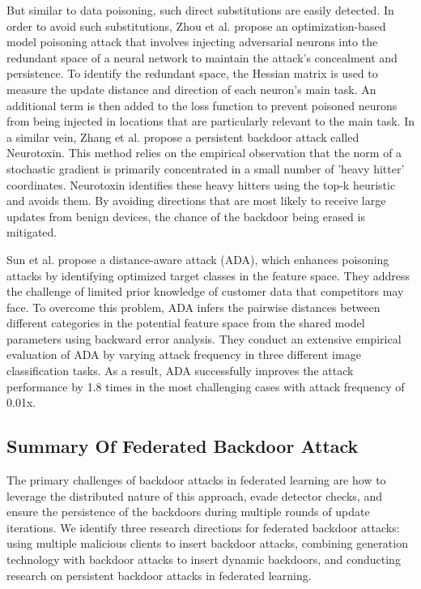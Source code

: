 \documentclass[conference]{IEEEtran}
\begin{document}
But similar to data poisoning, such direct substitutions are easily detected.
In order to avoid such substitutions,
Zhou et al.\cite{b63} propose an optimization-based model poisoning attack that
involves injecting adversarial neurons into the redundant space of a neural network
to maintain the attack's concealment and persistence. To identify the redundant
space, the Hessian matrix is used to measure the update distance and direction of each neuron's main task.
An additional term is then added to the loss function to prevent poisoned neurons from being injected
in locations that are particularly relevant to the main task.
In a similar vein, Zhang et al.\cite{b62}
propose a persistent backdoor attack called Neurotoxin. This method
relies on the empirical observation that the norm of a stochastic gradient
is primarily concentrated in a small number of 'heavy hitter' coordinates.
Neurotoxin identifies these heavy hitters using the top-k heuristic and
avoids them. By avoiding directions that are most likely to receive large
updates from benign devices, the chance of the backdoor being erased is mitigated.

Sun et al. \cite{b65}propose a distance-aware attack (ADA), which enhances poisoning attacks
by identifying optimized target classes in the feature space. They address the challenge of
limited prior knowledge of customer data that competitors may face. To overcome this problem,
ADA infers the pairwise distances between different categories in the potential feature space
from the shared model parameters using backward error analysis. They conduct an extensive
empirical evaluation of ADA by varying attack frequency in three different image classification
tasks. As a result, ADA successfully improves the attack performance by 1.8 times in the most
challenging cases with attack frequency of 0.01x.

\subsection{Summary Of Federated Backdoor Attack}
The primary challenges of backdoor attacks in federated learning are how
to leverage the distributed nature of this approach, evade detector checks,
and ensure the persistence of the backdoors during multiple rounds of update
iterations. We identify three research directions for federated backdoor
attacks: using multiple malicious clients to insert backdoor attacks,
combining generation technology with backdoor attacks to insert dynamic backdoors, and conducting
research on persistent backdoor attacks in federated learning.
\end{document}
